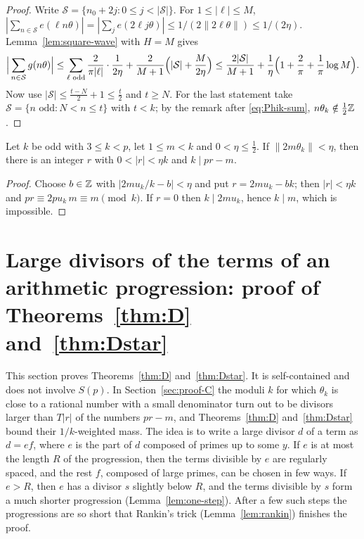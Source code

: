 \begin{proof}
Write $\mathcal{S}=\{n_0+2j:0\le j<|\mathcal{S}|\}$. For $1\le|\ell|\le M$,
$|\sum_{n\in\mathcal{S}}e(\ell n\theta)|=|\sum_je(2\ell j\theta)|\le1/(2\|2\ell\theta\|)\le1/(2\eta)$.
Lemma~\ref{lem:square-wave} with $H=M$ gives
\[
\Big|\sum_{n\in\mathcal{S}}g(n\theta)\Big|\le\sum_{\ell\text{ odd}}\frac2{\pi|\ell|}\cdot\frac1{2\eta}+\frac2{M+1}
\Bigl(|\mathcal{S}|+\frac M{2\eta}\Bigr)\le\frac{2|\mathcal{S}|}{M+1}+\frac1\eta\Bigl(1+\frac2\pi+\frac1\pi\log M\Bigr).
\]
Now use $|\mathcal{S}|\le\frac{t-N}2+1\le\frac t2$ and $t\ge N$. For the last statement take
$\mathcal{S}=\{n\text{ odd}:N<n\le t\}$ with $t<k$; by the remark after \eqref{eq:Phik-sum},
$n\theta_k\notin\frac12\mathbb{Z}$.
\end{proof}

\begin{lemma}[Witnesses]\label{lem:witnesses}
Let $k$ be odd with $3\le k<p$, let $1\le m<k$ and $0<\eta\le\frac12$. If $\|2m\theta_k\|<\eta$, then there is an
integer $r$ with $0<|r|<\eta k$ and $k\mid pr-m$.
\end{lemma}

\begin{proof}
Choose $b\in\mathbb{Z}$ with $|2mu_k/k-b|<\eta$ and put $r=2mu_k-bk$; then $|r|<\eta k$ and $pr\equiv2pu_k\,m\equiv m\pmod
k$. If $r=0$ then $k\mid2mu_k$, hence $k\mid m$, which is impossible.
\end{proof}

\section{Large divisors of the terms of an arithmetic progression: proof of Theorems~\texorpdfstring{\ref{thm:D} and~\ref{thm:Dstar}}{D and D*}}\label{sec:divisors}

This section proves Theorems~\ref{thm:D} and~\ref{thm:Dstar}. It is self-contained and does not involve $S(p)$. In Section~\ref{sec:proof-C} the moduli $k$ for which $\theta_k$ is close to a rational number with a small denominator turn out to be divisors larger than $T|r|$ of the numbers $pr-m$, and Theorems~\ref{thm:D} and~\ref{thm:Dstar} bound their $1/k$-weighted mass. The idea is to write a large divisor $d$ of a term as $d=ef$, where $e$ is the part of $d$ composed of primes up to some $y$. If $e$ is at most the length $R$ of the progression, then the terms divisible by $e$ are regularly spaced, and the rest $f$, composed of large primes, can be chosen in few ways. If $e>R$, then $e$ has a divisor $s$ slightly below $R$, and the terms divisible by $s$ form a much shorter progression (Lemma~\ref{lem:one-step}). After a few such steps the progressions are so short that Rankin's trick (Lemma~\ref{lem:rankin}) finishes the proof.

